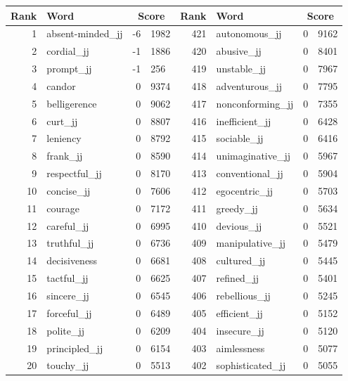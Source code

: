 \begin{table}[tbp]
    \begin{tabular}{| rlr@{.}l | rlr@{.}l |}
    \hline
    \textbf{Rank} & \textbf{Word} & \multicolumn{2}{c|}{\textbf{Score}} & \textbf{Rank} & \textbf{Word} & \multicolumn{2}{c|}{\textbf{Score}} \\
    \hline
    1 & absent-minded\_jj & -6 & 1982    &    421 & autonomous\_jj & 0 & 9162 \\
    2 & cordial\_jj & -1 & 1886    &    420 & abusive\_jj & 0 & 8401 \\
    3 & prompt\_jj & -1 & 256    &    419 & unstable\_jj & 0 & 7967 \\
    4 & candor & 0 & 9374    &    418 & adventurous\_jj & 0 & 7795 \\
    5 & belligerence & 0 & 9062    &    417 & nonconforming\_jj & 0 & 7355 \\
    6 & curt\_jj & 0 & 8807    &    416 & inefficient\_jj & 0 & 6428 \\
    7 & leniency & 0 & 8792    &    415 & sociable\_jj & 0 & 6416 \\
    8 & frank\_jj & 0 & 8590    &    414 & unimaginative\_jj & 0 & 5967 \\
    9 & respectful\_jj & 0 & 8170    &    413 & conventional\_jj & 0 & 5904 \\
    10 & concise\_jj & 0 & 7606    &    412 & egocentric\_jj & 0 & 5703 \\
    11 & courage & 0 & 7172    &    411 & greedy\_jj & 0 & 5634 \\
    12 & careful\_jj & 0 & 6995    &    410 & devious\_jj & 0 & 5521 \\
    13 & truthful\_jj & 0 & 6736    &    409 & manipulative\_jj & 0 & 5479 \\
    14 & decisiveness & 0 & 6681    &    408 & cultured\_jj & 0 & 5445 \\
    15 & tactful\_jj & 0 & 6625    &    407 & refined\_jj & 0 & 5401 \\
    16 & sincere\_jj & 0 & 6545    &    406 & rebellious\_jj & 0 & 5245 \\
    17 & forceful\_jj & 0 & 6489    &    405 & efficient\_jj & 0 & 5152 \\
    18 & polite\_jj & 0 & 6209    &    404 & insecure\_jj & 0 & 5120 \\
    19 & principled\_jj & 0 & 6154    &    403 & aimlessness & 0 & 5077 \\
    20 & touchy\_jj & 0 & 5513    &    402 & sophisticated\_jj & 0 & 5055 \\

\end{tabular}
\end{table}
